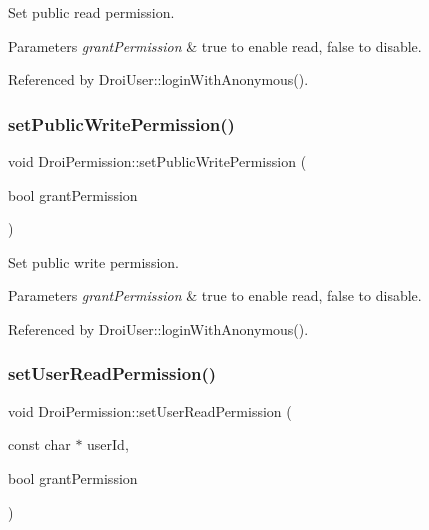 Set public read permission. 
\begin{DoxyParams}{Parameters}
{\em grant\+Permission} & true to enable read, false to disable. \\
\hline
\end{DoxyParams}


Referenced by Droi\+User\+::login\+With\+Anonymous().

\mbox{\label{class_droi_permission_abc786ec4b686910c88ef997f1274b450}} 
\subsubsection{\texorpdfstring{set\+Public\+Write\+Permission()}{setPublicWritePermission()}}
{\footnotesize\ttfamily void Droi\+Permission\+::set\+Public\+Write\+Permission (\begin{DoxyParamCaption}\item[{bool}]{grant\+Permission }\end{DoxyParamCaption})}

Set public write permission. 
\begin{DoxyParams}{Parameters}
{\em grant\+Permission} & true to enable read, false to disable. \\
\hline
\end{DoxyParams}


Referenced by Droi\+User\+::login\+With\+Anonymous().

\mbox{\label{class_droi_permission_ac4544f1c4a9ce40e2c59be14e46ab7cf}} 
\subsubsection{\texorpdfstring{set\+User\+Read\+Permission()}{setUserReadPermission()}}
{\footnotesize\ttfamily void Droi\+Permission\+::set\+User\+Read\+Permission (\begin{DoxyParamCaption}\item[{const char $\ast$}]{user\+Id,  }\item[{bool}]{grant\+Permission }\end{DoxyParamCaption})}

